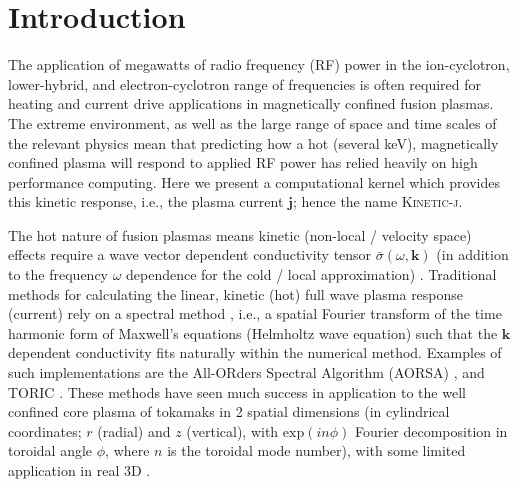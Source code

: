\documentclass[final,5p,times,twocolumn]{elsarticle}
\renewcommand{\vec}[1]{\mathbf{#1}}
\newcommand{\kj}{\textsc{Kinetic-j}\xspace}
\begin{document}
\section{Introduction}
\label{section:introduction}
The application of megawatts of radio frequency (RF) power in the ion-cyclotron, lower-hybrid, and electron-cyclotron range of frequencies is often required for heating and current drive applications in magnetically confined fusion plasmas. The extreme environment, as well as the large range of space and time scales of the relevant physics mean that predicting how a hot (several keV), magnetically confined plasma will respond to applied RF power has relied heavily on high performance computing. Here we present a computational kernel which provides this kinetic response, i.e., the plasma current $\vec{j}$; hence the name \kj.  
%

The hot nature of fusion plasmas means kinetic (non-local / velocity space) effects require a wave vector dependent conductivity tensor $\bar{\sigma}\left(\omega,\vec{k}\right)$ (in addition to the frequency $\omega$ dependence for the cold / local approximation) \cite[cf.,][]{stix,fukuyama1986}. Traditional methods for calculating the linear, kinetic (hot) full wave plasma response (current) rely on a spectral method \cite[e.g.,][]{brambilla1999,jaeger2001,jaeger2002a}, i.e., a spatial Fourier transform of the time harmonic form of Maxwell's equations (Helmholtz wave equation) such that the $\vec{k}$ dependent conductivity fits naturally within the numerical method. Examples of such implementations are the All-ORders Spectral Algorithm (AORSA) \cite{jaeger2003a}, and TORIC \cite{brambilla1999,wright2004}. These methods have seen much success in application to the well confined core plasma of tokamaks in 2 spatial dimensions (in cylindrical coordinates; $r$ (radial) and $z$ (vertical), with $\mathrm{exp}\left(in\phi\right)$ Fourier decomposition in toroidal angle $\phi$, where $n$ is the toroidal mode number), with some limited application in real 3D \cite[c.f. Fig.~8 of][]{jaeger2002a}. 
\end{document}

